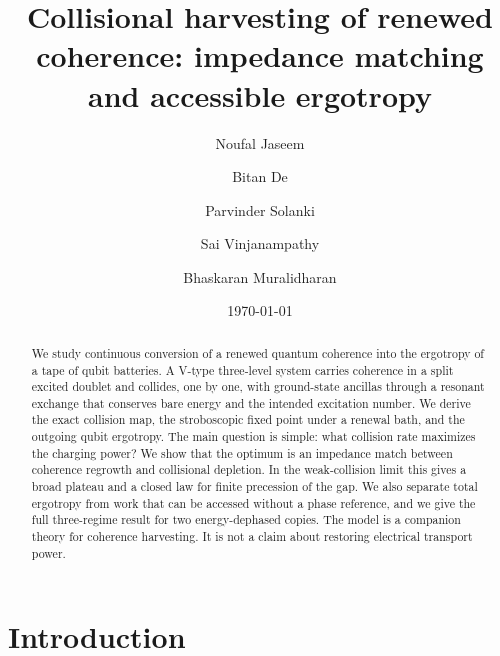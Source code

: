\documentclass[aps,pre,twocolumn,groupedaddress,amsmath,amssymb,nofootinbib]{revtex4-2}
\begin{document}
\title{Collisional harvesting of renewed coherence:
impedance matching and accessible ergotropy}

\author{Noufal Jaseem}
\author{Bitan De}
\author{Parvinder Solanki}
\author{Sai Vinjanampathy}
\author{Bhaskaran Muralidharan}
\date{\today}

\begin{abstract}
We study continuous conversion of a renewed quantum coherence into the
ergotropy of a tape of qubit batteries. A V-type three-level system carries
coherence in a split excited doublet and collides, one by one, with
ground-state ancillas through a resonant exchange that conserves bare energy
and the intended excitation number. We derive the exact collision map, the
stroboscopic fixed point under a renewal bath, and the outgoing qubit
ergotropy. The main question is simple: what collision rate maximizes the
charging power? We show that the optimum is an impedance match between
coherence regrowth and collisional depletion. In the weak-collision limit
this gives a broad plateau and a closed law for finite precession of the
gap. We also separate total ergotropy from work that can be accessed without
a phase reference, and we give the full three-regime result for two
energy-dephased copies. The model is a companion theory for coherence
harvesting. It is not a claim about restoring electrical transport power.
\end{abstract}

\maketitle

\section{Introduction}
\end{document}

